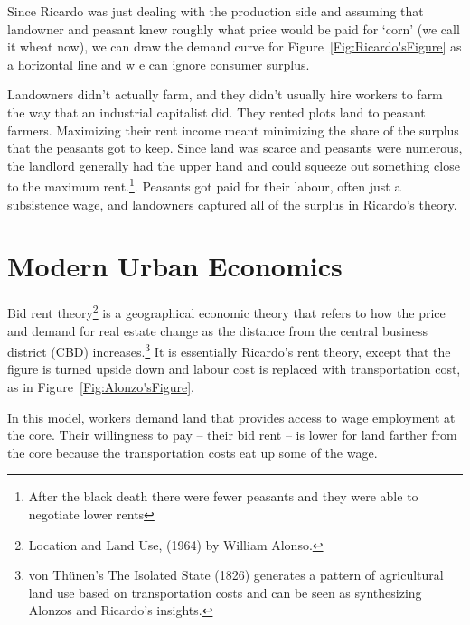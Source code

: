  Since Ricardo was  just dealing with the production side and assuming that landowner and peasant knew roughly what  price would be paid for `corn' (we call it wheat now), we can  draw the demand curve for  Figure~\ref{Fig:Ricardo'sFigure} as a horizontal line and w e can ignore consumer surplus.

Landowners didn't actually farm, and they didn't usually hire workers to farm the way that an industrial capitalist did. They rented plots land to peasant farmers.  Maximizing their rent  income meant minimizing the share of the surplus that the peasants got to keep. Since land was scarce and peasants were numerous, the landlord generally had the upper hand and could squeeze out something close to the maximum rent.\footnote{After the black death there were fewer peasants  and they were able to negotiate lower rents}. Peasants got paid for their labour, often just a subsistence wage, and landowners captured all of the surplus in Ricardo's theory.


\section{Modern Urban Economics}
Bid rent theory\footnote{Location and Land Use, (1964) by William Alonso.} is a geographical economic theory that refers to how the price and demand for real estate change as the distance from the central business district (CBD) increases.\footnote{von Th\"unen's The Isolated State (1826) generates a pattern of agricultural land use based on transportation costs and can be seen as synthesizing Alonzos and Ricardo's insights. } It is essentially Ricardo's rent theory, except that the figure is turned upside down and labour cost  is replaced with transportation cost, as in Figure~\ref{Fig:Alonzo'sFigure}. 

In this model, workers demand land that provides access to wage employment at the core. Their willingness to pay -- their bid rent -- is lower for land farther from the core because the transportation costs eat up some of the wage. 

